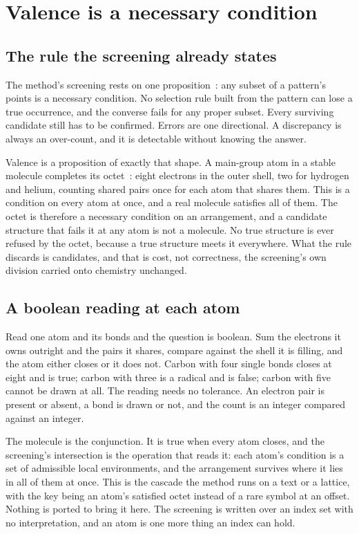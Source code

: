\chapter{Valence is a necessary condition}

\section{The rule the screening already states}

The method's screening rests on one proposition~\cite{src:Quigg-orior-workbook}: any subset of a
pattern's points is a necessary condition. No selection rule built from the pattern can lose a true
occurrence, and the converse fails for any proper subset. Every surviving candidate still has to be
confirmed. Errors are one directional. A discrepancy is always an over-count, and it is detectable
without knowing the answer.

Valence is a proposition of exactly that shape. A main-group atom in a stable molecule completes its
octet~\cite{src:Lewis-1916,src:Langmuir-1919}: eight electrons in the outer shell, two for hydrogen and helium, counting shared pairs once
for each atom that shares them. This is a condition on every atom at once, and a real molecule
satisfies all of them. The octet is therefore a necessary condition on an arrangement, and a candidate
structure that fails it at any atom is not a molecule. No true structure is ever refused by the
octet, because a true structure meets it everywhere. What the rule discards is candidates, and that
is cost, not correctness, the screening's own division carried onto chemistry unchanged.

\section{A boolean reading at each atom}

Read one atom and its bonds and the question is boolean. Sum the electrons it owns outright and the
pairs it shares, compare against the shell it is filling, and the atom either closes or it does not.
Carbon with four single bonds closes at eight and is true; carbon with three is a radical and is
false; carbon with five cannot be drawn at all. The reading needs no tolerance. An electron pair is
present or absent, a bond is drawn or not, and the count is an integer compared against an integer.

The molecule is the conjunction. It is true when every atom closes, and the screening's intersection
is the operation that reads it: each atom's condition is a set of admissible local environments, and
the arrangement survives where it lies in all of them at once. This is the cascade the method runs
on a text or a lattice, with the key being an atom's satisfied octet instead of a rare symbol at an
offset. Nothing is ported to bring it here. The screening is written over an index set with no
interpretation, and an atom is one more thing an index can hold.

